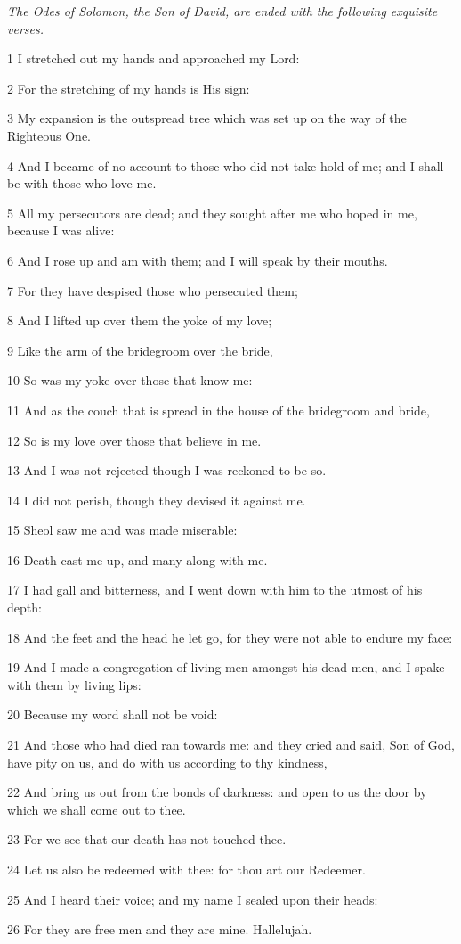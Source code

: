\par \textit{The Odes of Solomon, the Son of David, are ended with the following exquisite verses.}

\par 1 I stretched out my hands and approached my Lord:
\par 2 For the stretching of my hands is His sign:
\par 3 My expansion is the outspread tree which was set up on the way of the Righteous One.
\par 4 And I became of no account to those who did not take hold of me; and I shall be with those who love me.
\par 5 All my persecutors are dead; and they sought after me who hoped in me, because I was alive:
\par 6 And I rose up and am with them; and I will speak by their mouths.
\par 7 For they have despised those who persecuted them;
\par 8 And I lifted up over them the yoke of my love;
\par 9 Like the arm of the bridegroom over the bride,
\par 10 So was my yoke over those that know me:
\par 11 And as the couch that is spread in the house of the bridegroom and bride,
\par 12 So is my love over those that believe in me.
\par 13 And I was not rejected though I was reckoned to be so.
\par 14 I did not perish, though they devised it against me.
\par 15 Sheol saw me and was made miserable:
\par 16 Death cast me up, and many along with me.
\par 17 I had gall and bitterness, and I went down with him to the utmost of his depth:
\par 18 And the feet and the head he let go, for they were not able to endure my face:
\par 19 And I made a congregation of living men amongst his dead men, and I spake with them by living lips:
\par 20 Because my word shall not be void:
\par 21 And those who had died ran towards me: and they cried and said, Son of God, have pity on us, and do with us according to thy kindness,
\par 22 And bring us out from the bonds of darkness: and open to us the door by which we shall come out to thee.
\par 23 For we see that our death has not touched thee.
\par 24 Let us also be redeemed with thee: for thou art our Redeemer.
\par 25 And I heard their voice; and my name I sealed upon their heads:
\par 26 For they are free men and they are mine. Hallelujah.


